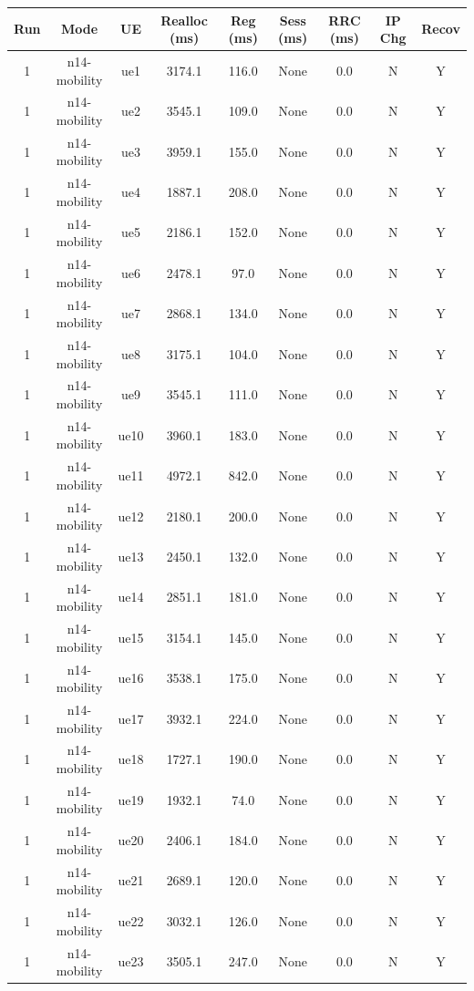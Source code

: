 \begin{table}[ht]
\centering
\begin{tabular}{|c|c|c|c|c|c|c|c|c|}
\hline
Run & Mode & UE & Realloc (ms) & Reg (ms) & Sess (ms) & RRC (ms) & IP Chg & Recov \\
\hline
1 & n14-mobility & ue1 & 3174.1 & 116.0 & None & 0.0 & N & Y \\
1 & n14-mobility & ue2 & 3545.1 & 109.0 & None & 0.0 & N & Y \\
1 & n14-mobility & ue3 & 3959.1 & 155.0 & None & 0.0 & N & Y \\
1 & n14-mobility & ue4 & 1887.1 & 208.0 & None & 0.0 & N & Y \\
1 & n14-mobility & ue5 & 2186.1 & 152.0 & None & 0.0 & N & Y \\
1 & n14-mobility & ue6 & 2478.1 & 97.0 & None & 0.0 & N & Y \\
1 & n14-mobility & ue7 & 2868.1 & 134.0 & None & 0.0 & N & Y \\
1 & n14-mobility & ue8 & 3175.1 & 104.0 & None & 0.0 & N & Y \\
1 & n14-mobility & ue9 & 3545.1 & 111.0 & None & 0.0 & N & Y \\
1 & n14-mobility & ue10 & 3960.1 & 183.0 & None & 0.0 & N & Y \\
1 & n14-mobility & ue11 & 4972.1 & 842.0 & None & 0.0 & N & Y \\
1 & n14-mobility & ue12 & 2180.1 & 200.0 & None & 0.0 & N & Y \\
1 & n14-mobility & ue13 & 2450.1 & 132.0 & None & 0.0 & N & Y \\
1 & n14-mobility & ue14 & 2851.1 & 181.0 & None & 0.0 & N & Y \\
1 & n14-mobility & ue15 & 3154.1 & 145.0 & None & 0.0 & N & Y \\
1 & n14-mobility & ue16 & 3538.1 & 175.0 & None & 0.0 & N & Y \\
1 & n14-mobility & ue17 & 3932.1 & 224.0 & None & 0.0 & N & Y \\
1 & n14-mobility & ue18 & 1727.1 & 190.0 & None & 0.0 & N & Y \\
1 & n14-mobility & ue19 & 1932.1 & 74.0 & None & 0.0 & N & Y \\
1 & n14-mobility & ue20 & 2406.1 & 184.0 & None & 0.0 & N & Y \\
1 & n14-mobility & ue21 & 2689.1 & 120.0 & None & 0.0 & N & Y \\
1 & n14-mobility & ue22 & 3032.1 & 126.0 & None & 0.0 & N & Y \\
1 & n14-mobility & ue23 & 3505.1 & 247.0 & None & 0.0 & N & Y \\

\end{tabular}
\end{table}
